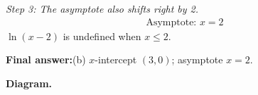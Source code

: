 \documentclass[11pt]{article}
\begin{document}
\textit{Step 3: The asymptote also shifts right by 2.}
\[\begin{gathered}
\text{Asymptote: } x = 2
\end{gathered}\]
\( \ln(x-2) \) is undefined when \( x \leq 2 \).

\begin{answerbox}
\textbf{Final answer:}\quad (b) \(\displaystyle  x \)-intercept \(\displaystyle  (3, 0) \); asymptote \(\displaystyle  x = 2 \).
\end{answerbox}
\textbf{Diagram.}

\begin{center}
\end{center}
\end{document}
